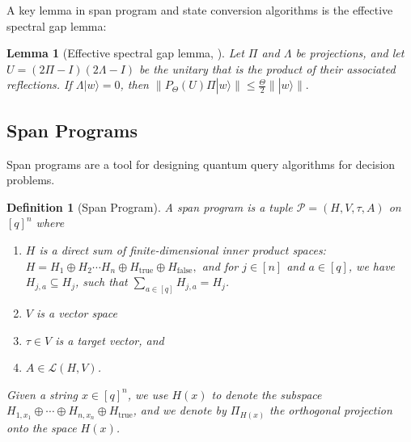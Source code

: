 \documentclass[cleveref, autoref, thm-restate,11pt]{article}
\newtheorem{lemma}[theorem]{Lemma}
\newtheorem{definition}[theorem]{Definition}
\theoremstyle{definition}
\newcommand{\sop}[1]{{\mathcal #1}}
\newcommand{\ket}[1]{|#1\rangle}
\newcommand{\PHx}{\Pi_{{H}(x)}}
\begin{document}
A key lemma in span program and state conversion algorithms is the effective spectral gap lemma:

\begin{lemma}[Effective spectral gap lemma, \cite{leeQuantumQueryComplexity2011}]
Let $\Pi$ and $\Lambda$ be projections, and let $U=(2\Pi-I)(2\Lambda-I)$ be the
unitary that is the product of their associated reflections. If
$\Lambda\ket{w}=0$, then $\|P_\Theta(U) \Pi\ket{w}\|\leq \frac{\Theta}{2}\|\ket{w}\|.$
\label{spec_gap_lemm}
\end{lemma}







\subsection{Span Programs}\label{sec:spanIntro}
Span programs are a tool for designing quantum query algorithms for decision problems.

\begin{definition} [Span Program] A span program is a tuple $\sop P=(H,V,\tau,A)$ on $[q]^n$ where
\begin{enumerate}
\item $H$ is a direct sum of finite-dimensional inner product spaces: $H=H_1\oplus H_2\cdots H_n\oplus H_\textrm{true}\oplus H_\textrm{false},$
and for $j\in [n]$ and $a\in[q]$, we have $H_{j,a}\subseteq H_j$, such that $\sum_{a\in [q]}H_{j,a}=H_j$.
\item $V$ is a vector space
\item $\tau\in V$ is a target vector, and
\item $A\in\sop L(H,V)$.
\end{enumerate}
Given a string $x\in[q]^n$, we use $H(x)$ to denote the subspace $H_{1,x_1}\oplus\cdots \oplus H_{n,x_n}\oplus H_\textrm{true}$, and we denote by $\PHx$ the orthogonal projection onto the space $H(x)$.

\label{def:SP}
\end{definition}
\end{document}

